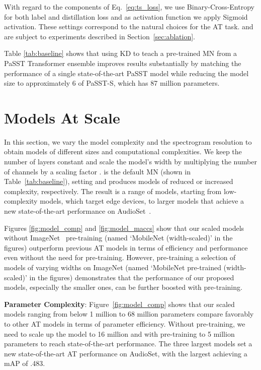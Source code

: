 \documentclass{article}
\begin{document}
With regard to the components of Eq.~\ref{eq:ts_loss}, we use Binary-Cross-Entropy for both label  and distillation loss  and as activation function  we apply Sigmoid activation. These settings correspond to the natural choices for the AT task.  and  are subject to experiments described in Section~\ref{sec:ablation}.  

Table \ref{tab:baseline} shows that using KD to teach a pre-trained MN from a PaSST Transformer ensemble improves results substantially by matching the performance of a single state-of-the-art PaSST model while reducing the model size to approximately 6 of PaSST-S, which has 87 million parameters.

\vspace{-6pt}
\section{Models At Scale}
\label{subsec:model_comp}

In this section, we vary the model complexity and the spectrogram resolution to obtain models of different sizes and computational complexities. We keep the number of layers constant and scale the model's width by multiplying the number of channels by a scaling factor .  is the default MN (shown in Table~\ref{tab:baseline}), setting  and  produces models of reduced or increased complexity, respectively. The result is a range of models, starting from low-complexity models, which target edge devices, to larger models that achieve a new state-of-the-art performance on AudioSet~\cite{audioset2017Gemmeke}. 

Figures \ref{fig:model_comp} and \ref{fig:model_maccs} show that our scaled models without ImageNet~\cite{Deng09ImageNet} pre-training (named `MobileNet (width-scaled)' in the figures) outperform previous AT models in terms of efficiency and performance even without the need for pre-training.
However, pre-training a selection of models of varying widths on ImageNet (named `MobileNet pre-trained (width-scaled)' in the figures) demonstrates that the performance of our proposed models, especially the smaller ones, can be further boosted with pre-training.

\textbf{Parameter Complexity}: Figure~\ref{fig:model_comp} shows that our scaled models ranging from below 1 million to 68 million parameters compare favorably to other AT models in terms of parameter efficiency. Without pre-training, we need to scale up the model to 16 million and with pre-training to 5 million parameters to reach state-of-the-art performance. The three largest models set a new state-of-the-art AT performance on AudioSet, with the largest achieving a mAP of .483.
\end{document}
